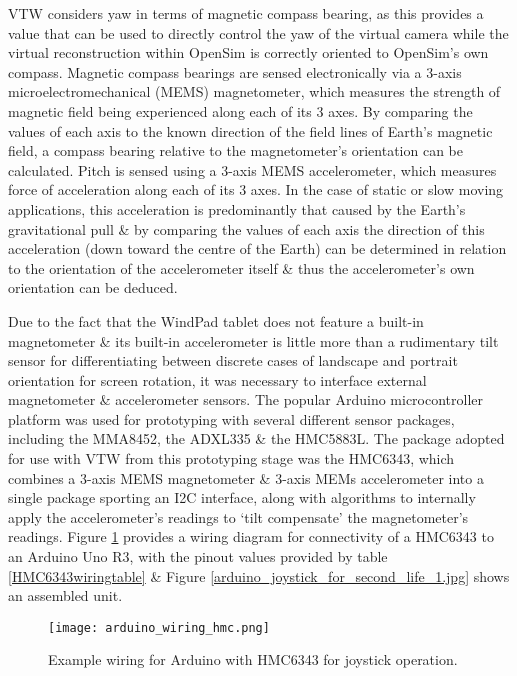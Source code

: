 VTW considers yaw in terms of magnetic compass bearing, as this provides a value that can be used to directly control the yaw of the virtual camera while the virtual reconstruction within OpenSim is correctly oriented to OpenSim's own compass. Magnetic compass bearings are sensed electronically via a 3-axis microelectromechanical (MEMS) magnetometer, which measures the strength of magnetic field being experienced along each of its 3 axes. By comparing the values of each axis to the known direction of the field lines of Earth's magnetic field, a compass bearing relative to the magnetometer's orientation can be calculated. Pitch is sensed using a 3-axis MEMS accelerometer, which measures force of acceleration along each of its 3 axes. In the case of static or slow moving applications, this acceleration is predominantly that caused by the Earth's gravitational pull \& by comparing the values of each axis the direction of this acceleration (down toward the centre of the Earth) can be determined in relation to the orientation of the accelerometer itself \& thus the accelerometer's own orientation can be deduced.

Due to the fact that the WindPad tablet does not feature a built-in magnetometer \& its built-in accelerometer is little more than a rudimentary tilt sensor for differentiating between discrete cases of landscape and portrait orientation for screen rotation, it was necessary to interface external magnetometer \& accelerometer sensors. The popular Arduino\ArduinoFootnote{} microcontroller platform was used for prototyping with several different sensor packages, including the MMA8452\MMAfootnote{}, the ADXL335\ADXLfootnote{} \& the HMC5883L\HMCfootnote{}. The package adopted for use with VTW from this prototyping stage was the HMC6343\HMCtwoFootnote{}, which combines a 3-axis MEMS magnetometer \& 3-axis MEMs accelerometer into a single package sporting an I2C interface, along with algorithms to internally apply the accelerometer's readings to `tilt compensate' the magnetometer's readings. Figure \ref{arduino_wiring_hmc.png} provides a wiring diagram for connectivity of a HMC6343 to an Arduino Uno R3, with the pinout values provided by table \ref{HMC6343wiringtable} \& Figure \ref{arduino_joystick_for_second_life_1.jpg} shows an assembled unit.

\begin{figure}[h]
\centering
  \texttt{[image: arduino\_wiring\_hmc.png]}
  \caption{Example wiring for Arduino with HMC6343 for joystick operation.}
  \label{arduino_wiring_hmc.png}
\end{figure}

